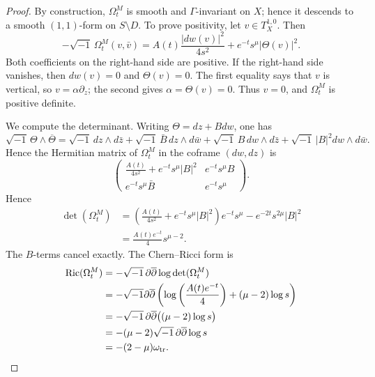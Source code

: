 \documentclass[12pt]{amsart}
\numberwithin{equation}{section}
\newcommand{\ddbar}{\sqrt{-1}\,\partial\overline\partial}
\theoremstyle{remark}
\theoremstyle{definition}
\begin{document}
\begin{proof}
By construction, $\Omega_t^M$ is smooth and $\Gamma$-invariant on $X$;
hence it descends to a smooth $(1,1)$-form on $S\setminus D$. To prove positivity, let $v\in T_X^{1,0}$. Then
\begin{equation*}
 -\sqrt{-1}\,\Omega_t^M(v,\bar v)
 =
 A(t)\frac{|dw(v)|^2}{4s^2}
 +
 e^{-t}s^\mu|\Theta(v)|^2.
\end{equation*}
Both coefficients on the right-hand side are positive. If the right-hand side vanishes, then
$dw(v)=0$ and $\Theta(v)=0$. The first equality says that $v$ is
vertical, so $v=\alpha\partial_z$; the second gives
$\alpha=\Theta(v)=0$. Thus $v=0$, and $\Omega_t^M$ is positive definite.

We compute the determinant. Writing $\Theta=dz+Bdw$, one has
$$
\sqrt{-1}\,\Theta\wedge\overline\Theta=\sqrt{-1}\,dz\wedge d\bar z+\sqrt{-1}\,\bar B\,dz\wedge d\bar w+\sqrt{-1}\,B\,dw\wedge d\bar z+\sqrt{-1}\,|B|^2dw\wedge d\bar w.
$$
Hence the Hermitian matrix of $\Omega_t^M$ in the coframe $(dw,dz)$ is
\begin{equation*}
 \begin{pmatrix}
 \displaystyle \frac{A(t)}{4s^2}+e^{-t}s^\mu |B|^2
 &
 \displaystyle e^{-t}s^\mu B
 \\
 \displaystyle e^{-t}s^\mu\bar B
 &
 \displaystyle e^{-t}s^\mu
 \end{pmatrix}.
\end{equation*}
Hence
\begin{align*}
 \det(\Omega_t^M)
 &=
 \left(
 \frac{A(t)}{4s^2}
 +
 e^{-t}s^\mu|B|^2
\right)e^{-t}s^\mu
 -
 e^{-2t}s^{2\mu}|B|^2 \\
 &=
 \frac{A(t)e^{-t}}4s^{\mu-2}.
\end{align*}
The $B$-terms cancel exactly.
The Chern--Ricci form is
\begin{align*}
\operatorname{Ric}(\Omega_t^M)
 &= -\ddbar\log\det(\Omega_t^M) \\
 &= -\sqrt{-1}\partial\overline\partial \left( \log\left(\frac{A(t)e^{-t}}4\right) + (\mu-2)\log s\right) \\
 &= -\ddbar\bigl((\mu-2)\log s\bigr) \\
 &= -(\mu-2)\ddbar\log s \\
 &= -(2-\mu)\omega_{\rm tr}.
\end{align*}


\end{proof}
\end{document}
